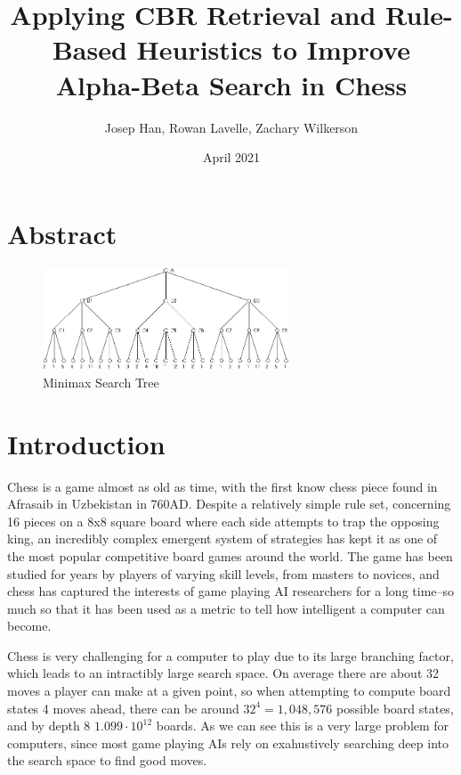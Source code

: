 \documentclass[letterpaper]{article}
\title{Applying CBR Retrieval and Rule-Based Heuristics to Improve Alpha-Beta Search in Chess}
\author{Josep Han, Rowan Lavelle, Zachary Wilkerson}
\date{April 2021}
\begin{document}
\maketitle
\section{Abstract}

\begin{figure}
    \centering
    \includegraphics[width=0.65\textwidth]{minimax.jpg}
    \caption{Minimax Search Tree}
    \label{fig:my_label}
\end{figure}

\section{Introduction}
Chess is a game almost as old as time, with the first know chess piece found in Afrasaib in Uzbekistan in 760AD. Despite a relatively simple rule set, concerning 16 pieces on a 8x8 square board where each side attempts to trap the opposing king, an incredibly complex emergent system of strategies has kept it as one of the most popular competitive board games around the world. The game has been studied for years by players of varying skill levels, from masters to novices, and chess has captured the interests of game playing AI researchers for a long time--so much so that it has been used as a metric to tell how intelligent a computer can become.

Chess is very challenging for a computer to play due to its large branching factor, which leads to an intractibly large search space.  On average there are about 32 moves a player can make at a given point, so when attempting to compute board states 4 moves ahead, there can be around $32^4=1,048,576$ possible board states, and by depth 8 $1.099 \cdot 10^{12}$ boards. As we can see this is a very large problem for computers, since most game playing AIs rely on exahustively searching deep into the search space to find good moves.
\end{document}
